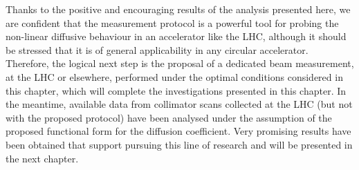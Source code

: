 Thanks to the positive and encouraging results of the analysis presented here, we are confident that the measurement protocol is a powerful tool for probing the non-linear diffusive behaviour in an accelerator like the LHC, although it should be stressed that it is of general applicability in any circular accelerator. Therefore, the logical next step is the proposal of a dedicated beam measurement, at the LHC or elsewhere, performed under the optimal conditions considered in this chapter, which will complete the investigations presented in this chapter. In the meantime, available data from collimator scans collected at the LHC (but not with the proposed protocol) have been analysed under the assumption of the proposed functional form for the diffusion coefficient. Very promising results have been obtained that support pursuing this line of research and will be presented in the next chapter.

